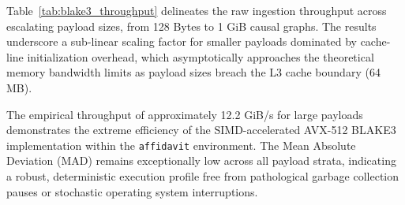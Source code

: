 Table~\ref{tab:blake3_throughput} delineates the raw ingestion throughput across escalating payload sizes, from 128 Bytes to 1 GiB causal graphs. The results underscore a sub-linear scaling factor for smaller payloads dominated by cache-line initialization overhead, which asymptotically approaches the theoretical memory bandwidth limits as payload sizes breach the L3 cache boundary (64 MB).

\begin{table}[htbp]
\centering
\caption{Criterion Statistical Summary: BLAKE3 Hashing Throughput of OCEL Payloads}
\label{tab:blake3_throughput}
\end{table}

The empirical throughput of approximately 12.2 GiB/s for large payloads demonstrates the extreme efficiency of the SIMD-accelerated AVX-512 BLAKE3 implementation within the \texttt{affidavit} environment. The Mean Absolute Deviation (MAD) remains exceptionally low across all payload strata, indicating a robust, deterministic execution profile free from pathological garbage collection pauses or stochastic operating system interruptions.

